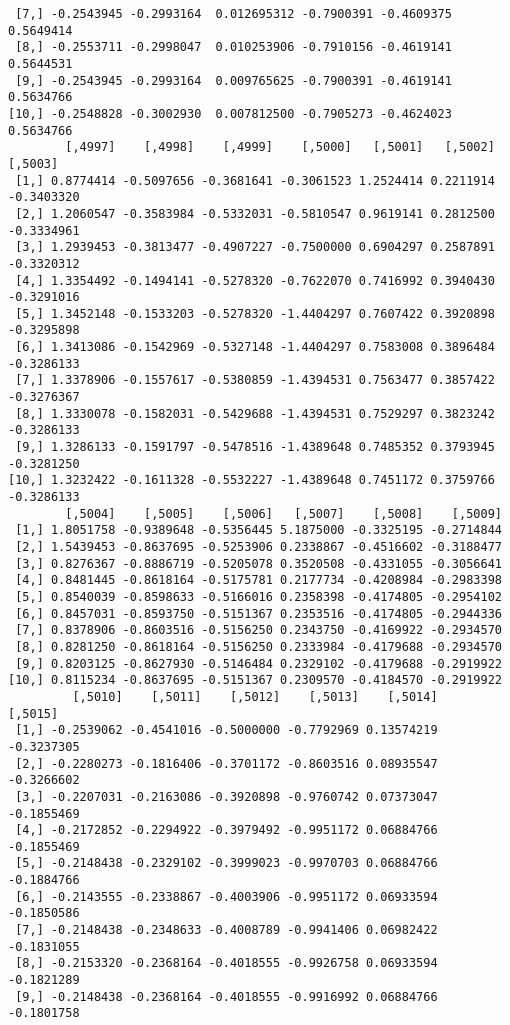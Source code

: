 \documentclass[
  letterpaper,
  DIV=11,
  numbers=noendperiod]{scrreprt}
\begin{document}
\begin{verbatim}
 [7,] -0.2543945 -0.2993164  0.012695312 -0.7900391 -0.4609375 0.5649414
 [8,] -0.2553711 -0.2998047  0.010253906 -0.7910156 -0.4619141 0.5644531
 [9,] -0.2543945 -0.2993164  0.009765625 -0.7900391 -0.4619141 0.5634766
[10,] -0.2548828 -0.3002930  0.007812500 -0.7905273 -0.4624023 0.5634766
        [,4997]    [,4998]    [,4999]    [,5000]   [,5001]   [,5002]    [,5003]
 [1,] 0.8774414 -0.5097656 -0.3681641 -0.3061523 1.2524414 0.2211914 -0.3403320
 [2,] 1.2060547 -0.3583984 -0.5332031 -0.5810547 0.9619141 0.2812500 -0.3334961
 [3,] 1.2939453 -0.3813477 -0.4907227 -0.7500000 0.6904297 0.2587891 -0.3320312
 [4,] 1.3354492 -0.1494141 -0.5278320 -0.7622070 0.7416992 0.3940430 -0.3291016
 [5,] 1.3452148 -0.1533203 -0.5278320 -1.4404297 0.7607422 0.3920898 -0.3295898
 [6,] 1.3413086 -0.1542969 -0.5327148 -1.4404297 0.7583008 0.3896484 -0.3286133
 [7,] 1.3378906 -0.1557617 -0.5380859 -1.4394531 0.7563477 0.3857422 -0.3276367
 [8,] 1.3330078 -0.1582031 -0.5429688 -1.4394531 0.7529297 0.3823242 -0.3286133
 [9,] 1.3286133 -0.1591797 -0.5478516 -1.4389648 0.7485352 0.3793945 -0.3281250
[10,] 1.3232422 -0.1611328 -0.5532227 -1.4389648 0.7451172 0.3759766 -0.3286133
        [,5004]    [,5005]    [,5006]   [,5007]    [,5008]    [,5009]
 [1,] 1.8051758 -0.9389648 -0.5356445 5.1875000 -0.3325195 -0.2714844
 [2,] 1.5439453 -0.8637695 -0.5253906 0.2338867 -0.4516602 -0.3188477
 [3,] 0.8276367 -0.8886719 -0.5205078 0.3520508 -0.4331055 -0.3056641
 [4,] 0.8481445 -0.8618164 -0.5175781 0.2177734 -0.4208984 -0.2983398
 [5,] 0.8540039 -0.8598633 -0.5166016 0.2358398 -0.4174805 -0.2954102
 [6,] 0.8457031 -0.8593750 -0.5151367 0.2353516 -0.4174805 -0.2944336
 [7,] 0.8378906 -0.8603516 -0.5156250 0.2343750 -0.4169922 -0.2934570
 [8,] 0.8281250 -0.8618164 -0.5156250 0.2333984 -0.4179688 -0.2934570
 [9,] 0.8203125 -0.8627930 -0.5146484 0.2329102 -0.4179688 -0.2919922
[10,] 0.8115234 -0.8637695 -0.5151367 0.2309570 -0.4184570 -0.2919922
         [,5010]    [,5011]    [,5012]    [,5013]    [,5014]    [,5015]
 [1,] -0.2539062 -0.4541016 -0.5000000 -0.7792969 0.13574219 -0.3237305
 [2,] -0.2280273 -0.1816406 -0.3701172 -0.8603516 0.08935547 -0.3266602
 [3,] -0.2207031 -0.2163086 -0.3920898 -0.9760742 0.07373047 -0.1855469
 [4,] -0.2172852 -0.2294922 -0.3979492 -0.9951172 0.06884766 -0.1855469
 [5,] -0.2148438 -0.2329102 -0.3999023 -0.9970703 0.06884766 -0.1884766
 [6,] -0.2143555 -0.2338867 -0.4003906 -0.9951172 0.06933594 -0.1850586
 [7,] -0.2148438 -0.2348633 -0.4008789 -0.9941406 0.06982422 -0.1831055
 [8,] -0.2153320 -0.2368164 -0.4018555 -0.9926758 0.06933594 -0.1821289
 [9,] -0.2148438 -0.2368164 -0.4018555 -0.9916992 0.06884766 -0.1801758

\end{verbatim}
\end{document}
